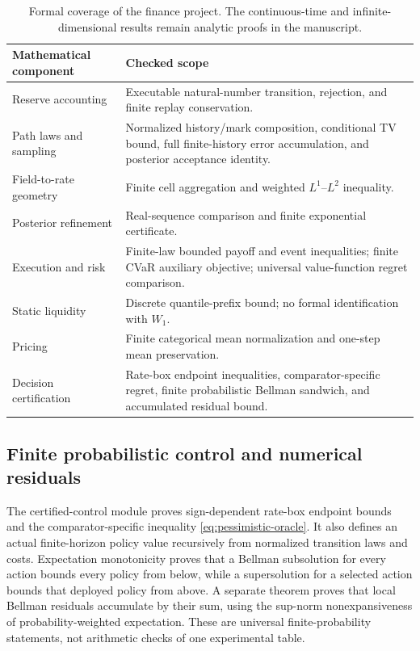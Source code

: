 \begin{table}[htbp]
\centering\small
\begin{tabularx}{\textwidth}{@{}p{}X@{}}
\toprule
Mathematical component & Checked scope\\
\midrule
Reserve accounting & Executable natural-number transition, rejection, and finite replay conservation.\\
Path laws and sampling & Normalized history/mark composition, conditional TV bound, full finite-history error accumulation, and posterior acceptance identity.\\
Field-to-rate geometry & Finite cell aggregation and weighted $L^1$--$L^2$ inequality.\\
Posterior refinement & Real-sequence comparison and finite exponential certificate.\\
Execution and risk & Finite-law bounded payoff and event inequalities; finite CVaR auxiliary objective; universal value-function regret comparison.\\
Static liquidity & Discrete quantile-prefix bound; no formal identification with $W_1$.\\
Pricing & Finite categorical mean normalization and one-step mean preservation.\\
Decision certification & Rate-box endpoint inequalities, comparator-specific regret, finite probabilistic Bellman sandwich, and accumulated residual bound.\\
\bottomrule
\end{tabularx}
\caption{Formal coverage of the finance project. The continuous-time and infinite-dimensional results remain analytic proofs in the manuscript.}
\end{table}

\subsection{Finite probabilistic control and numerical residuals}
The certified-control module proves sign-dependent rate-box endpoint bounds and the comparator-specific inequality \eqref{eq:pessimistic-oracle}. It also defines an actual finite-horizon policy value recursively from normalized transition laws and costs. Expectation monotonicity proves that a Bellman subsolution for every action bounds every policy from below, while a supersolution for a selected action bounds that deployed policy from above. A separate theorem proves that local Bellman residuals accumulate by their sum, using the sup-norm nonexpansiveness of probability-weighted expectation. These are universal finite-probability statements, not arithmetic checks of one experimental table.

